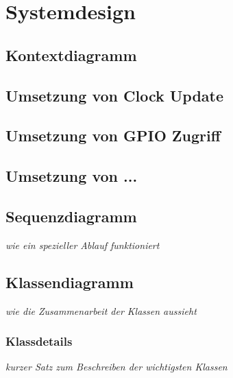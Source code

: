 \section{Systemdesign}
        \subsection{Kontextdiagramm}
    	\subsection{Umsetzung von Clock Update}
		\subsection{Umsetzung von GPIO Zugriff}
		\subsection{Umsetzung von ...}
		\subsection{Sequenzdiagramm}
			\textit{wie ein spezieller Ablauf funktioniert}
		\subsection{Klassendiagramm}
			\textit{wie die Zusammenarbeit der Klassen aussieht}
			\subsubsection{Klassdetails}
				\textit{kurzer Satz zum Beschreiben der wichtigsten Klassen}